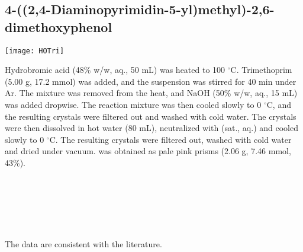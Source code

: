 

\subsection{4-((2,4-Diaminopyrimidin-5-yl)methyl)-2,6-dimethoxyphenol }


\begin{scheme}[H]
	\begin{center}
		\texttt{[image: HOTri]}
	\end{center}
\end{scheme}

Hydrobromic acid (48\% w/w, aq., 50 mL) was heated to 100 $^{\circ}$C. Trimethoprim  (5.00 g, 17.2 mmol) was added, and the suspension was stirred for 40 min under Ar. The mixture was removed from the heat, and NaOH (50\% w/w, aq., 15 mL) was added dropwise. The reaction mixture was then cooled slowly to 0 $^{\circ}$C, and the resulting crystals were filtered out and washed with cold water. The crystals were then dissolved in hot water (80 mL), neutralized with  (sat., aq.) and cooled slowly to 0 $^{\circ}$C. The resulting crystals were filtered out, washed with cold water and dried under vacuum.  was obtained as pale pink prisms (2.06 g, 7.46 mmol, 43\%).
\\[1\baselineskip]
\\[1\baselineskip]
\\[1\baselineskip]
\\[1\baselineskip]
\\[1\baselineskip]
\\[1\baselineskip]
\\[1\baselineskip]
The data are consistent with the literature\cite{Jing2013}.

